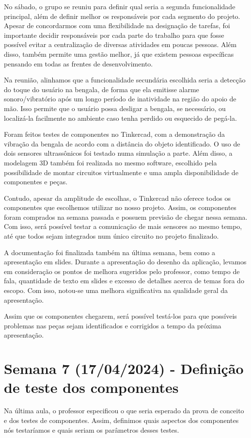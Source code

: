 No sábado, o grupo se reuniu para definir qual seria a segunda funcionalidade principal, além de definir melhor os responsáveis por cada segmento do projeto. Apesar de concordarmos com uma flexibilidade na designação de tarefas, foi importante decidir responsáveis por cada parte do trabalho para que fosse possível evitar a centralização de diversas atividades em poucas pessoas. Além disso, também permite uma gestão melhor, já que existem pessoas específicas pensando em todas as frentes de desenvolvimento.

Na reunião, alinhamos que a funcionalidade secundária escolhida seria a detecção do toque do usuário na bengala, de forma que ela emitisse alarme sonoro/vibratório após um longo período de inatividade na região do apoio de mão. Isso permite que o usuário possa desligar a bengala, se necessário, ou localizá-la facilmente no ambiente caso tenha perdido ou esquecido de pegá-la.

Foram feitos testes de componentes no Tinkercad, com a demonstração da vibração da bengala de acordo com a distância do objeto identificado. O uso de dois sensores ultrassônicos foi testado numa simulação a parte. Além disso, a modelagem 3D também foi realizada no mesmo software, escolhido pela possibilidade de montar circuitos virtualmente e uma ampla disponibilidade de componentes e peças. 

Contudo, apesar da amplitude de escolhas, o Tinkercad não oferece todos os componentes que escolhemos utilizar no nosso projeto. Assim, os componentes foram comprados na semana passada e possuem previsão de chegar nessa semana. Com isso, será possível testar a comunicação de mais sensores ao mesmo tempo, até que todos sejam integrados num único circuito no projeto finalizado.

A documentação foi finalizada também na última semana, bem como a apresentação em slides. Durante a apresentação do desenho da aplicação, levamos em consideração os pontos de melhora sugeridos pelo professor, como tempo de fala, quantidade de texto em slides e excesso de detalhes acerca de temas fora do escopo. Com isso, notou-se uma melhora significativa na qualidade geral da apresentação.

Assim que os componentes chegarem, será possível testá-los para que possíveis problemas nas peças sejam identificados e corrigidos a tempo da próxima apresentação.

\section{Semana 7 (17/04/2024) - Definição de teste dos componentes }
Na última aula, o professor especificou o que seria esperado da prova de conceito e dos testes de componentes. Assim, definimos quais aspectos dos componentes nós testaríamos e quais seriam os parâmetros desses testes.

